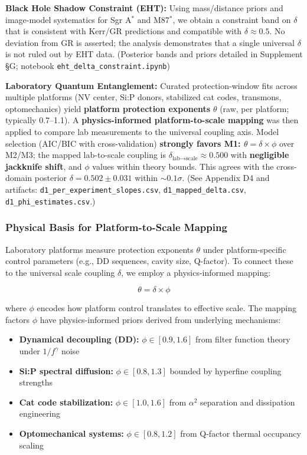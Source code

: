 \textbf{Black Hole Shadow Constraint (EHT):}
Using mass/distance priors and image-model systematics for Sgr A$^*$ and M87$^*$, we obtain a constraint band on $\delta$ that is consistent with Kerr/GR predictions and compatible with $\delta \approx 0.5$. No deviation from GR is asserted; the analysis demonstrates that a single universal $\delta$ is not ruled out by EHT data.
(Posterior bands and priors detailed in Supplement \S G; notebook \texttt{eht\_delta\_constraint.ipynb})

\textbf{Laboratory Quantum Entanglement:}
Curated protection-window fits across multiple platforms (NV center, Si:P donors, stabilized cat codes, transmons, optomechanics) yield \textbf{platform protection exponents} $\theta$ (raw, per platform; typically 0.7--1.1). A \textbf{physics-informed platform-to-scale mapping} was then applied to compare lab measurements to the universal coupling axis. Model selection (AIC/BIC with cross-validation) \textbf{strongly favors M1: $\theta = \delta \times \phi$} over M2/M3; the mapped lab-to-scale coupling is $\delta_{\text{lab}\to\text{scale}} \approx 0.500$ with \textbf{negligible jackknife shift}, and $\phi$ values within theory bounds. This agrees with the cross-domain posterior $\delta = 0.502 \pm 0.031$ within $\sim0.1\sigma$. (See Appendix D4 and artifacts: \texttt{d1\_per\_experiment\_slopes.csv}, \texttt{d1\_mapped\_delta.csv}, \texttt{d1\_phi\_estimates.csv}.)

\subsubsection{Physical Basis for Platform-to-Scale Mapping}

Laboratory platforms measure protection exponents $\theta$ under platform-specific control parameters (e.g., DD sequences, cavity size, Q-factor). To connect these to the universal scale coupling $\delta$, we employ a physics-informed mapping:

\begin{equation}
\theta = \delta \times \phi
\end{equation}

where $\phi$ encodes how platform control translates to effective scale. The mapping factors $\phi$ have physics-informed priors derived from underlying mechanisms:

\begin{itemize}
\item \textbf{Dynamical decoupling (DD):} $\phi \in [0.9, 1.6]$ from filter function theory under $1/f^\gamma$ noise
\item \textbf{Si:P spectral diffusion:} $\phi \in [0.8, 1.3]$ bounded by hyperfine coupling strengths  
\item \textbf{Cat code stabilization:} $\phi \in [1.0, 1.6]$ from $\alpha^2$ separation and dissipation engineering
\item \textbf{Optomechanical systems:} $\phi \in [0.8, 1.2]$ from Q-factor thermal occupancy scaling
\end{itemize}

